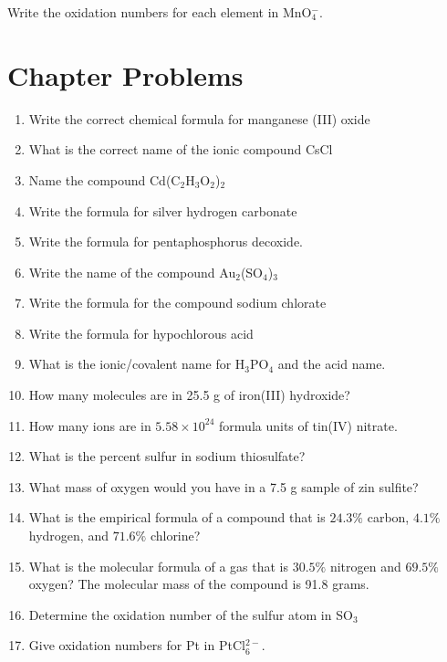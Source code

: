 \documentclass[../hchem.tex]{subfiles}
\begin{document}
\ex Write the oxidation numbers for each element in MnO$_4^-$.

\section*{Chapter Problems}
\begin{enumerate}
    \item Write the correct chemical formula for manganese (III) oxide
    \item What is the correct name of the ionic compound CsCl
    \item Name the compound Cd(C$_2$H$_3$O$_2$)$_2$
    \item Write the formula for silver hydrogen carbonate 
    \item Write the formula for pentaphosphorus decoxide.
    \item Write the name of the compound Au$_2$(SO$_4$)$_3$
    \item Write the formula for the compound sodium chlorate
    \item Write the formula for hypochlorous acid 
    \item What is the ionic/covalent name for H$_3$PO$_4$ and the acid name.
    \item How many molecules are in 25.5 g of iron(III) hydroxide?
    \item How many ions are in $5.58\times 10^{24}$ formula units of tin(IV) nitrate.
    \item What is the percent sulfur in sodium thiosulfate?
    \item What mass of oxygen would you have in a 7.5 g sample of zin sulfite?
    \item What is the empirical formula of a compound that is $24.3\%$ carbon, $4.1\%$ hydrogen, and $71.6\%$ chlorine?
    \item What is the molecular formula of a gas that is $30.5\%$ nitrogen and $69.5\%$ oxygen? The molecular mass of the compound is 91.8 grams.
    \item Determine the oxidation number of the sulfur atom in SO$_3$
    \item Give oxidation numbers for Pt in PtCl$_6^{2-}$.
\end{enumerate}
\end{document}
